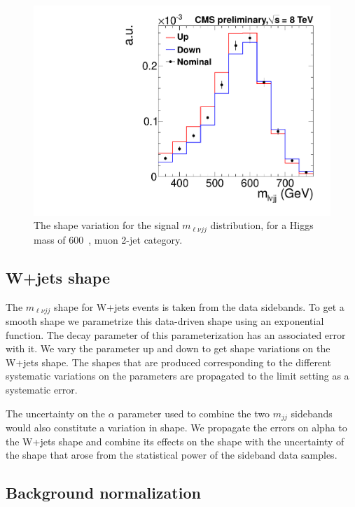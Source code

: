 \begin{figure}[t!]
  \begin{center}
    \includegraphics[width=0.5\linewidth]{plots/anaexample/H600_Muon_2jets_Signal_Shape.pdf}
  \caption{The shape variation for the signal $m_{\ell\nu jj}$ distribution,
  for a Higgs mass of 600~\GeV, muon 2-jet category. }
  \label{fig:sigshapeintfunc}
  \end{center}
\end{figure}


\subsection{W+jets shape}
\label{sec:syst_mlvjj}
The $m_{\ell\nu jj}$ shape for W+jets events is taken from the data
sidebands. To get a smooth shape we parametrize this data-driven
shape using an exponential function. The decay parameter of this
parameterization has an associated error with it. We vary the
parameter up and down to get shape variations on the W+jets shape.
The shapes that are produced corresponding to the different systematic
variations on the parameters are propagated to the limit setting as a
systematic error.

The uncertainty on the $\alpha$ parameter used to combine the two
$m_{jj}$ sidebands would also constitute a variation in shape.  We
propagate the errors on alpha to the W+jets shape and combine its
effects on the shape with the uncertainty of the shape that arose
from the statistical power of the sideband data samples.

\subsection{Background normalization}
\label{sec:syst_mjj}

